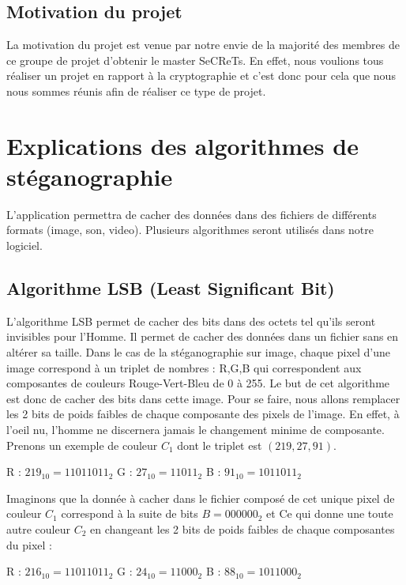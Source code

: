 \documentclass[11pt]{article}
\begin{document}
\subsection{Motivation du projet}

La motivation du projet est venue par notre envie de la majorité des membres de ce groupe de projet d'obtenir le master SeCReTs. 
En effet, nous voulions tous réaliser un projet en rapport à la cryptographie et c'est donc pour cela que nous nous sommes réunis afin de réaliser ce type de projet. 

\section{Explications des algorithmes de stéganographie}

L'application permettra de cacher des données dans des fichiers de différents formats (image, son, video). 
Plusieurs algorithmes seront utilisés dans notre logiciel.

\subsection{Algorithme LSB (Least Significant Bit)}

L'algorithme LSB permet de cacher des bits dans des octets tel qu'ils seront invisibles pour l'Homme. 
Il permet de cacher des données dans un fichier sans en altérer sa taille. 
Dans le cas de la stéganographie sur image, chaque pixel d'une image correspond à un triplet de nombres : R,G,B qui correspondent aux composantes de couleurs Rouge-Vert-Bleu de 0 à 255. 
Le but de cet algorithme est donc de cacher des bits dans cette image. Pour se faire, nous allons remplacer les 2 bits de poids faibles de chaque composante des pixels de l'image. 
En effet, à l'oeil nu, l'homme ne discernera jamais le changement minime de composante. 
Prenons un exemple de couleur $C_1$ dont le triplet est $(219,27,91)$. 

R : $219_{10} = 11011011_2$	\qquad G : $27_{10} = 11011_2$ \qquad B : $91_{10} = 1011011_2$


Imaginons que la donnée à cacher dans le fichier composé de cet unique pixel de couleur $C_1$ correspond à la suite de bits $B = 000000_2$ et
Ce qui donne une toute autre couleur $C_2$ en changeant les 2 bits de poids faibles de chaque composantes du pixel : 

R : $216_{10} = 11011011_2$ \qquad G : $24_{10} = 11000_2$ \qquad B : $88_{10} = 1011000_2$
\end{document}
